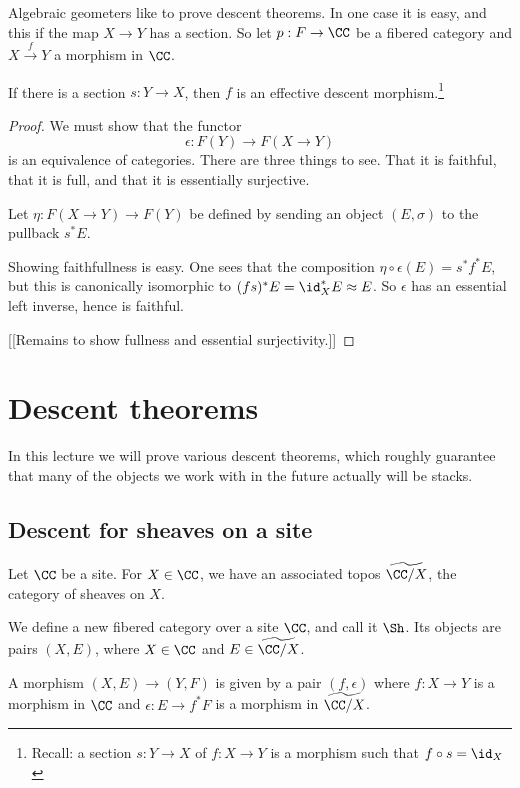 \documentclass[11pt, english]{article}
\begin{document}
Algebraic geometers like to prove descent theorems. In one case it is easy, and this if the map $X \to Y$ has a section. So let $p:F \to \CC$ be a fibered category and $X \xrightarrow{f} Y$ a morphism in $\CC$.

\begin{prop}
If there is a section $s:Y \to X$, then $f$ is an effective descent morphism.\footnote{Recall: a section $s:Y \to X$ of $f:X \to Y$ is a morphism such that $f \circ s = \id_X$}
\end{prop}
\begin{proof}
We must show that the functor
\[
\epsilon:F(Y) \to F(X \to Y)
\]
is an equivalence of categories. There are three things to see. That it is faithful, that it is full, and that it is essentially surjective.

Let $\eta:F(X \to Y) \to F(Y)$ be defined by sending an object $(E,\sigma)$ to the pullback $s^\ast E$. 

Showing faithfullness is easy. One sees that the composition $\eta \circ \epsilon(E) = s^\ast f^\ast E$, but this is canonically isomorphic to $(fs)^\ast E = \id_X^\ast E \approx E$. So $\epsilon$ has an essential left inverse, hence is faithful.

[[Remains to show fullness and essential surjectivity.]]
\end{proof}


\pagebreak
\section{Descent theorems}
\label{sec:descent}
In this lecture we will prove various descent theorems, which roughly guarantee that many of the objects we work with in the future actually will be stacks.

\subsection{Descent for sheaves on a site}

Let $\CC$ be a site. For $X \in \CC$, we have an associated topos $\widetilde{\CC/X}$, the category of sheaves on $X$.

We define a new fibered category over a site $\CC$, and call it $\Sh$. Its objects are pairs $(X,E)$, where $X \in \CC$ and $E \in \widetilde{\CC/X}$.

A morphism $(X,E) \to (Y,F)$ is given by a pair $(f,\epsilon)$ where $f:X \to Y$ is a morphism in $\CC$ and $\epsilon: E \to f^\ast F$ is a morphism in $\widetilde{\CC/X}$. 
\end{document}

